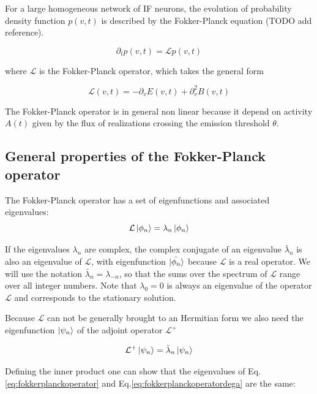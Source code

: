 \documentclass[12pt,twoside]{report}
\begin{document}
For a large homogeneous network of IF neurons, the evolution of probability density function $p(v,t)$ is described by the Fokker-Planck equation (TODO add reference).  

\begin{equation}
\label{eq:fokkerplanck}
\partial_t p(v,t)=\mathcal{L}p(v,t)
\end{equation}

where $\mathcal{L}$ is the Fokker-Planck operator, which takes the general form

\begin{equation}
\label{eq:Lfokker}
\mathcal{L}(v,t)=-\partial_v E(v,t) +\partial_v^2 B(v,t)
\end{equation}

The Fokker-Planck operator is in general non linear because it depend on activity $A(t)$ given by the flux of realizations crossing the emission threshold $\theta$.


\subsection{General properties of the Fokker-Planck operator}
The Fokker-Planck operator has a set of eigenfunctions and associated eigenvalues:
\begin{equation}
\label{eq:fokkerplanckoperator}
\mathcal{L}\ket{\phi_n}=\lambda_n\ket{\phi_n}
\end{equation}

If the eigenvalues $\lambda_n$ are complex, the complex conjugate of an eigenvalue  $\bar{\lambda}_n$  is also an eigenvalue of $\mathcal{L}$, with eigenfunction $\ket{\bar{\phi_n}}$ because $\mathcal{L}$ is a real operator. We will use the notation $\bar{\lambda}_n=\lambda_{-n}$, so that the sums over the spectrum of $\mathcal{L}$ range over all integer numbers. Note that $\lambda_0=0$ is always an eigenvalue of the operator $\mathcal{L}$ and corresponds to the stationary solution.

Because $\mathcal{L}$ can not be generally brought to an Hermitian form we also need  the eigenfunction $\ket{\psi_n}$ of the adjoint operator  $\mathcal{L}^{+}$

\begin{equation}
\label{eq:fokkerplanckoperatordega}
\mathcal{L}^+\ket{\psi_n}=\tilde{\lambda}_n\ket{\psi_n}
\end{equation}

Defining the inner product one can show that the eigenvalues of Eq.\eqref{eq:fokkerplanckoperator} and Eq.\eqref{eq:fokkerplanckoperatordega} are the same:
\end{document}

